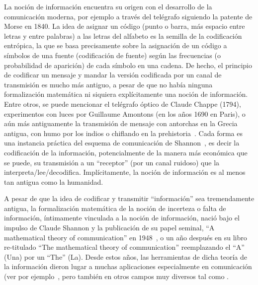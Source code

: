 \label{s:SZ:Introduccion}

La  noci\'on  de informaci\'on  encuentra  su origen  con  el  desarrollo de  la
comunicaci\'on  moderna, por  ejemplo a  trav\'es del  tel\'egrafo  siguiendo la
patente de Morse en  1840. La idea de asignar un c\'odigo  (punto o barra, m\'as
espacio entre letras  y entre palabras) a las letras del  alfabeto es la semilla
de  la  codificaci\'on  entr\'opica,  la  que  se  basa  precisamente  sobre  la
asignaci\'on  de un  c\'odigo  a  s\'imbolos de  una  fuente (codificaci\'on  de
fuente)  seg\'un  las  frecuencias  (o  probabilidad  de  aparici\'on)  de  cada
s\'imbolo  en una  cadena.  De  hecho, el  principio de  codificar un  mensaje y
mandar  la versi\'on codificada  por un  canal de  transmisi\'on es  mucho m\'as
antiguo,  a pesar  de que  no  hab\'ia ninguna  formalizaci\'on matem\'atica  ni
siquiera expl\'icitamente una noci\'on  de informaci\'on.  Entre otros, se puede
mencionar  el tel\'egrafo  \'optico de  Claude Chappe  (1794),  experimentos con
luces  por Guillaume  Amontons (en  los  a\~nos 1690  en Paris),  o a\'un  m\'as
antiguamente la transmisi\'on de mensaje con antorchas en la Grecia antigua, con
humo por los  indios o chiflando en la  prehistoria~\cite{Mon08}.  Cada forma es
una instancia  pr\'actica del esquema de  comunicaci\'on de Shannon~\cite{Sha48,
ShaWea64}, es decir la codificaci\'on  de la informaci\'on, potencialmente de la
manera m\'as econ\'omica  que se puede, su transmisi\'on  a un ``receptor'' (por
un  canal  ruidoso)  que  la  interpreta/lee/decodifica.   Impl\'icitamente,  la
noci\'on de informaci\'on es al menos tan antigua como la humanidad.

A  pesar  de  que  la  idea  de codificar  y  transmitir  ``informaci\'on''  sea
tremendamente  antigua,  la  formalizaci\'on  matem\'atica  de  la  noci\'on  de
incerteza o  falta de  informaci\'on, \'intimamente vinculada  a la  noci\'on de
informaci\'on, naci\'o bajo  el impulso de Claude Shannon  y la publicaci\'on de
su   papel   seminal,   ``A    mathematical   theory   of   communication''   en
1948~\cite{Sha48},  o   un  a\~no  despu\'es  en  su   libro  re-titulado  ``The
mathematical  theory  of communication''  reemplazando  el  ``A''  (Una) por  un
``The''  (La). Desde  estos a\~nos,  las herramientas  de dicha  teor\'ia  de la
informaci\'on dieron lugar a muchas aplicaciones especialmente en comunicaci\'on
(ver por ejemplo~\cite[y ref.]{CovTho06,  Ver98, Gal01}, pero tambi\'en en otros
campos  muy diversos  tal como  .


